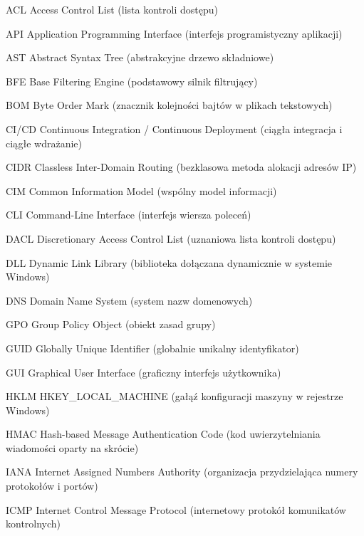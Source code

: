 \UnnumberedChapter{\abbrevname}

\begin{abbreviations}
    \item[ACL]     Access Control List (lista kontroli dostępu)
    \item[API]     Application Programming Interface (interfejs programistyczny aplikacji)
    \item[AST]     Abstract Syntax Tree (abstrakcyjne drzewo składniowe)
    \item[BFE]     Base Filtering Engine (podstawowy silnik filtrujący)
    \item[BOM]     Byte Order Mark (znacznik kolejności bajtów w plikach tekstowych)
    \item[CI/CD]   Continuous Integration / Continuous Deployment (ciągła integracja i ciągłe wdrażanie)
    \item[CIDR]    Classless Inter-Domain Routing (bezklasowa metoda alokacji adresów IP)
    \item[CIM]     Common Information Model (wspólny model informacji)
    \item[CLI]     Command-Line Interface (interfejs wiersza poleceń)
    \item[DACL]    Discretionary Access Control List (uznaniowa lista kontroli dostępu)
    \item[DLL]     Dynamic Link Library (biblioteka dołączana dynamicznie w systemie Windows)
    \item[DNS]     Domain Name System (system nazw domenowych)
    \item[GPO]     Group Policy Object (obiekt zasad grupy)
    \item[GUID]    Globally Unique Identifier (globalnie unikalny identyfikator)
    \item[GUI]     Graphical User Interface (graficzny interfejs użytkownika)
    \item[HKLM]    HKEY\_LOCAL\_MACHINE (gałąź konfiguracji maszyny w rejestrze Windows)
    \item[HMAC]    Hash-based Message Authentication Code (kod uwierzytelniania wiadomości oparty na skrócie)
    \item[IANA]    Internet Assigned Numbers Authority (organizacja przydzielająca numery protokołów i portów)
    \item[ICMP]    Internet Control Message Protocol (internetowy protokół komunikatów kontrolnych)

\end{abbreviations}
